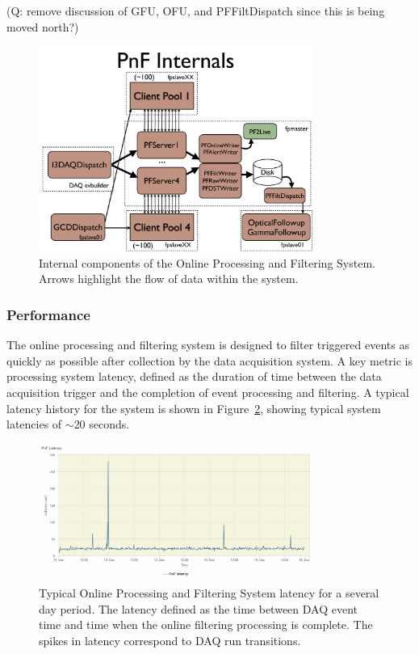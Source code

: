 (Q: remove discussion of GFU, OFU, and PFFiltDispatch since this is being moved north?)

\begin{figure}[!h]
 \centering
 \includegraphics[width=0.8\textwidth]{graphics/online/pnf/PnF_Internals.pdf}
 \caption{Internal components of the Online Processing and Filtering System.  Arrows highlight the flow of data within the system.}
 \label{fig:online_pnf_internals}
\end{figure}

\subsubsection{Performance}
The online processing and filtering system is designed to filter triggered events as quickly as possible after collection by
the data acquisition system.   A key metric is processing system latency, defined as the duration of time between the data acquisition trigger 
and the completion of event processing and filtering.  A typical latency history for the system is shown in Figure~\ref{fig:online_pnf_latency}, showing
typical system latencies of $\sim$20 seconds.

\begin{figure}[!h]
 \centering
 \includegraphics[width=0.8\textwidth]{graphics/online/pnf/pnf_latency.png}
 \caption{Typical Online Processing and Filtering System latency for a several day period.  The latency defined as the time between DAQ event time and time when the
 online filtering processing is complete.  The spikes in latency correspond to DAQ run transitions.}
 \label{fig:online_pnf_latency}
\end{figure}

